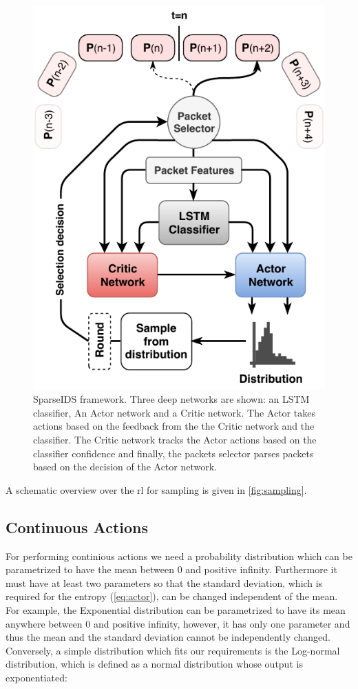 \documentclass[conference]{IEEEtran}
\begin{document}
\begin{figure}
\centering
  \includegraphics[width=\columnwidth]{img/rnn-sampling.pdf}
  \caption{SparseIDS framework. Three deep networks are shown: an LSTM classifier, An Actor network and a Critic network. The Actor takes actions based on the feedback from the the Critic network and the classifier. The Critic network tracks the Actor actions based on the classifier confidence and finally, the packets selector parses packets based on the decision of the Actor network.}
  \label{fig:sampling}
\end{figure}

A schematic overview over the \gls{rl} for sampling is given in \autoref{fig:sampling}. 

\subsection{Continuous Actions}

For performing continious actions we need a probability distribution which can be parametrized to have the mean between 0 and positive infinity. Furthermore it must have at least two parameters so that the standard deviation, which is required for the entropy (\autoref{eq:actor}), can be changed independent of the mean. For example, the Exponential distribution can be parametrized to have its mean anywhere between 0 and positive infinity, however, it has only one parameter and thus the mean and the standard deviation cannot be independently changed. Conversely, a simple distribution which fits our requirements is the Log-normal distribution, which is defined as a normal distribution whose output is exponentiated:
\end{document}
